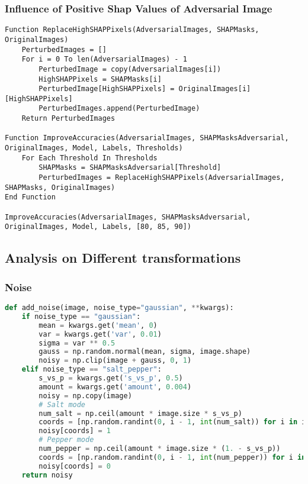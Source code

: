 \documentclass{article}
\begin{document}
\subsubsection{Influence of Positive Shap Values of Adversarial Image} 

\begin{lstlisting}[caption={Logical Pseudocode for Pixel Replacement and Accuracy Calculation}, mathescape=true, label={lst:pseudocode}]
Function ReplaceHighSHAPPixels(AdversarialImages, SHAPMasks, OriginalImages)
    PerturbedImages = []
    For i = 0 To len(AdversarialImages) - 1
        PerturbedImage = copy(AdversarialImages[i])
        HighSHAPPixels = SHAPMasks[i]
        PerturbedImage[HighSHAPPixels] = OriginalImages[i][HighSHAPPixels]
        PerturbedImages.append(PerturbedImage)
    Return PerturbedImages

Function ImproveAccuracies(AdversarialImages, SHAPMasksAdversarial, OriginalImages, Model, Labels, Thresholds)
    For Each Threshold In Thresholds
        SHAPMasks = SHAPMasksAdversarial[Threshold]
        PerturbedImages = ReplaceHighSHAPPixels(AdversarialImages, SHAPMasks, OriginalImages)
End Function

ImproveAccuracies(AdversarialImages, SHAPMasksAdversarial, OriginalImages, Model, Labels, [80, 85, 90])
\end{lstlisting}
\subsection{Analysis on Different transformations} 

\subsubsection{Noise} 
\begin{lstlisting}[language=Python, caption=Image Processing Functions]
def add_noise(image, noise_type="gaussian", **kwargs):
    if noise_type == "gaussian":
        mean = kwargs.get('mean', 0)
        var = kwargs.get('var', 0.01)
        sigma = var ** 0.5
        gauss = np.random.normal(mean, sigma, image.shape)
        noisy = np.clip(image + gauss, 0, 1)
    elif noise_type == "salt_pepper":
        s_vs_p = kwargs.get('s_vs_p', 0.5)
        amount = kwargs.get('amount', 0.004)
        noisy = np.copy(image)
        # Salt mode
        num_salt = np.ceil(amount * image.size * s_vs_p)
        coords = [np.random.randint(0, i - 1, int(num_salt)) for i in image.shape]
        noisy[coords] = 1
        # Pepper mode
        num_pepper = np.ceil(amount * image.size * (1. - s_vs_p))
        coords = [np.random.randint(0, i - 1, int(num_pepper)) for i in image.shape]
        noisy[coords] = 0
    return noisy

\end{lstlisting}
\end{document}
